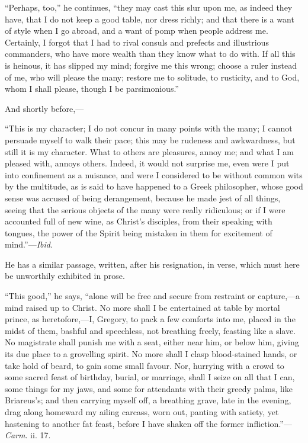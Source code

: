 ``Perhaps, too,'' he continues, ``they may cast this
slur upon me, as indeed they have, that I do not keep a good table,
nor dress richly; and that there is a want of style when I go abroad,
and a want of pomp when people address me. Certainly, I forgot that I
had to rival consuls and prefects and illustrious commanders, who have
more wealth than they know what to do with. If all this is heinous, it
has slipped my mind; forgive me this wrong; choose a ruler instead of
me, who will please the many; restore me to solitude, to rusticity,
and to God, whom I shall please, though I be parsimonious.''

And shortly before,—

``This is my character; I do not concur in many points with the
many; I cannot persuade myself to walk their pace; this may be
rudeness and awkwardness, but still it is my character. What to others
are pleasures, annoy me; and what I am pleased with, annoys others.
Indeed, it would not surprise me, even were I put into confinement as
a nuisance, and were I considered to be without common wits by the
multitude, as is said to have happened to a Greek philosopher, whose
good sense was accused of being derangement, because he made jest of
all things, seeing that the serious objects of the many were really
ridiculous; or if I were accounted full of new wine, as Christ's
disciples, from their speaking with tongues, the power of the Spirit
being mistaken in them for excitement of mind.''—\emph{Ibid}.

He has a similar passage, written, after his resignation, in verse,
which must here be unworthily exhibited in prose.

``This good,'' he says, ``alone will be free and secure
from restraint or capture,—a mind raised up to Christ. No more shall
I be entertained at table by mortal prince, as heretofore,—I,
Gregory, to pack a few comforts into me, placed in the midst of them,
bashful and speechless, not breathing freely, feasting like a slave.
No magistrate shall punish me with a seat, either near him, or below
him, giving its due place to a grovelling spirit. No more shall I
clasp blood-stained hands, or take hold of beard, to gain some small
favour. Nor, hurrying with a crowd to some sacred feast of birthday, burial, or marriage, shall I seize on all
that I can, some things for my jaws, and some for attendants with
their greedy palms, like Briareus's; and then carrying myself off, a
breathing grave, late in the evening, drag along homeward my ailing
carcass, worn out, panting with satiety, yet hastening to another fat
feast, before I have shaken off the former infliction.''—\emph{Carm}.
ii. 17.

